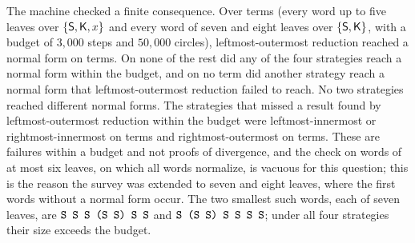 The machine checked a finite consequence. Over \factNormTerms{} terms (every word up to five leaves over $\{\mathsf{S},\mathsf{K},x\}$ and every word of seven and eight leaves over $\{\mathsf{S},\mathsf{K}\}$, with a budget of $3{,}000$ steps and $50{,}000$ circles), leftmost-outermost reduction reached a normal form on \factNormLoNormal{} terms. On none of the rest did any of the four strategies reach a normal form within the budget, and on no term did another strategy reach a normal form that leftmost-outermost reduction failed to reach. No two strategies reached different normal forms. The strategies that missed a result found by leftmost-outermost reduction within the budget were leftmost-innermost or rightmost-innermost on \factInnermostMiss{} terms and rightmost-outermost on \factRoMiss{} terms. These are failures within a budget and not proofs of divergence, and the check on words of at most six leaves, on which all words normalize, is vacuous for this question; this is the reason the survey was extended to seven and eight leaves, where the first words without a normal form occur. The two smallest such words, each of seven leaves, are $\texttt{S S S (S S) S S}$ and $\texttt{S (S S) S S S S}$; under all four strategies their size exceeds the budget.
